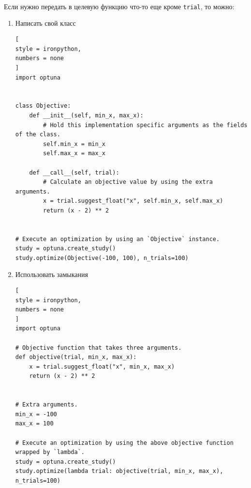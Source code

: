 \documentclass[%
	11pt,
	a4paper,
	utf8,
		]{article}
\begin{document}
Если нужно передать в целевую функцию что-то еще кроме \verb|trial|, то можно:
\begin{enumerate}
	\item Написать свой класс 
\begin{lstlisting}[
style = ironpython,
numbers = none
]
import optuna


class Objective:
	def __init__(self, min_x, max_x):
		# Hold this implementation specific arguments as the fields of the class.
		self.min_x = min_x
		self.max_x = max_x

	def __call__(self, trial):
		# Calculate an objective value by using the extra arguments.
		x = trial.suggest_float("x", self.min_x, self.max_x)
		return (x - 2) ** 2


# Execute an optimization by using an `Objective` instance.
study = optuna.create_study()
study.optimize(Objective(-100, 100), n_trials=100)
\end{lstlisting}

    \item Использовать замыкания
\begin{lstlisting}[
style = ironpython,
numbers = none
]
import optuna

# Objective function that takes three arguments.
def objective(trial, min_x, max_x):
	x = trial.suggest_float("x", min_x, max_x)
	return (x - 2) ** 2


# Extra arguments.
min_x = -100
max_x = 100

# Execute an optimization by using the above objective function wrapped by `lambda`.
study = optuna.create_study()
study.optimize(lambda trial: objective(trial, min_x, max_x), n_trials=100)
\end{lstlisting}
\end{enumerate}
\end{document}
